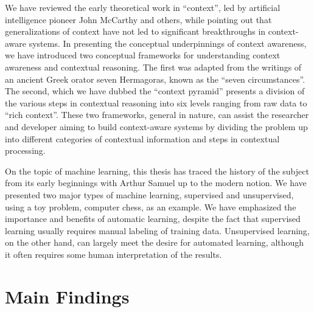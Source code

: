 We have reviewed the early theoretical work in ``context'', led by artificial intelligence pioneer John McCarthy and others, while pointing out that generalizations of context have not led to significant breakthroughs in context-aware systems. In presenting the conceptual underpinnings of context awareness, we have introduced two conceptual frameworks for understanding context awareness and contextual reasoning. The first was adapted from the writings of an ancient Greek orator seven Hermagoras, known as the ``seven circumstances''. The second, which we have dubbed the ``context pyramid'' presents a division of the various steps in contextual reasoning into six levels ranging from raw data to ``rich context''. These two frameworks, general in nature, can assist the researcher and developer aiming to build context-aware systems by dividing the problem up into different categories of contextual information and steps in contextual processing.

On the topic of machine learning, this thesis has traced the history of the subject from its early beginnings with Arthur Samuel up to the modern notion. We have presented two major types of machine learning, supervised and unsupervised, using a toy problem, computer chess, as an example. We have emphasized the importance and benefits of automatic learning, despite the fact that supervised learning usually requires manual labeling of training data. Unsupervised learning, on the other hand, can largely meet the desire for automated learning, although it often requires some human interpretation of the results.

\section{Main Findings}
\label{sec:main_findings}

